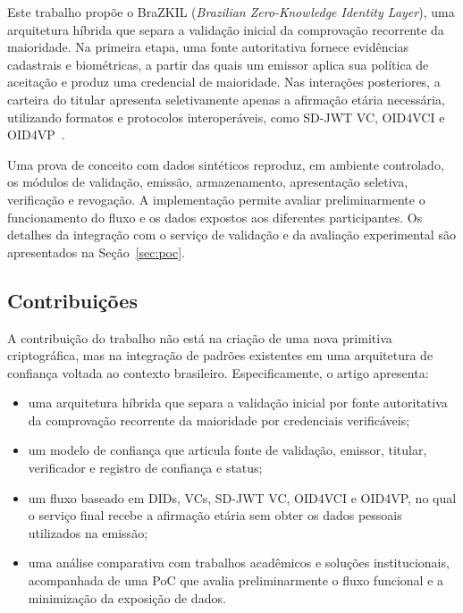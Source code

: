 \documentclass[12pt]{article}
\begin{document}
Este trabalho propõe o BraZKIL (\textit{Brazilian Zero-Knowledge Identity Layer}), uma arquitetura híbrida que separa a validação inicial da comprovação recorrente da maioridade. Na primeira etapa, uma fonte autoritativa fornece evidências cadastrais e biométricas, a partir das quais um emissor aplica sua política de aceitação e produz uma credencial de maioridade. Nas interações posteriores, a carteira do titular apresenta seletivamente apenas a afirmação etária necessária, utilizando formatos e protocolos interoperáveis, como SD-JWT VC, OID4VCI e OID4VP~\cite{openid4vci2024,openid4vp2023}.

Uma prova de conceito com dados sintéticos reproduz, em ambiente controlado, os módulos de validação, emissão, armazenamento, apresentação seletiva, verificação e revogação. A implementação permite avaliar preliminarmente o funcionamento do fluxo e os dados expostos aos diferentes participantes. Os detalhes da integração com o serviço de validação e da avaliação experimental são apresentados na Seção~\ref{sec:poc}.

\subsection{Contribuições}
\label{sec:contribuicoes}

A contribuição do trabalho não está na criação de uma nova primitiva criptográfica, mas na integração de padrões existentes em uma arquitetura de confiança voltada ao contexto brasileiro. Especificamente, o artigo apresenta:

\begin{itemize}
    \setlength{\itemsep}{1pt}

    \item uma arquitetura híbrida que separa a validação inicial por fonte autoritativa da comprovação recorrente da maioridade por credenciais verificáveis;

    \item um modelo de confiança que articula fonte de validação, emissor, titular, verificador e registro de confiança e status;

    \item um fluxo baseado em DIDs, VCs, SD-JWT VC, OID4VCI e OID4VP, no qual o serviço final recebe a afirmação etária sem obter os dados pessoais utilizados na emissão;

    \item uma análise comparativa com trabalhos acadêmicos e soluções institucionais, acompanhada de uma PoC que avalia preliminarmente o fluxo funcional e a minimização da exposição de dados.
\end{itemize}
\end{document}
